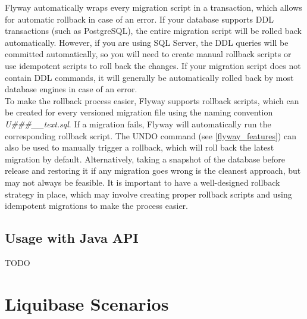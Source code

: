 %
Flyway automatically wraps every migration script in a transaction, which allows for automatic rollback in case of an error. If your database supports DDL transactions (such as PostgreSQL), the entire migration script will be rolled back automatically. However, if you are using SQL Server, the DDL queries will be committed automatically, so you will need to create manual rollback scripts or use idempotent scripts to roll back the changes. If your migration script does not contain DDL commands, it will generally be automatically rolled back by most database engines in case of an error.\\
To make the rollback process easier, Flyway supports rollback scripts, which can be created for every versioned migration file using the naming convention \textit{U\#\#\#\_\_text.sql}. If a migration fails, Flyway will automatically run the corresponding rollback script. The UNDO command (see \autoref{flyway_features}) can also be used to manually trigger a rollback, which will roll back the latest migration by default. Alternatively, taking a snapshot of the database before release and restoring it if any migration goes wrong is the cleanest approach, but may not always be feasible. It is important to have a well-designed rollback strategy in place, which may involve creating proper rollback scripts and using idempotent migrations to make the process easier.

\subsection{Usage with Java API}
%
TODO\\



\newpage
\section{Liquibase Scenarios}



\newpage